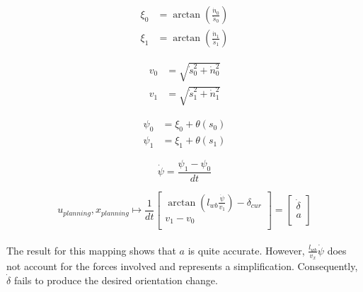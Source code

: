 \[
	\begin{aligned}
		\xi_0 & = \arctan\left(\frac{\dot{n}_0}{\dot{s}_0}\right) \\
		\xi_1 & = \arctan\left(\frac{\dot{n}_1}{\dot{s}_1}\right)
	\end{aligned}
\]

\[
	\begin{aligned}
		v_0 & = \sqrt{\dot{s}_0^2 + \dot{n}_0^2} \\
		v_1 & = \sqrt{\dot{s}_1^2 + \dot{n}_1^2}
	\end{aligned}
\]

\[
	\begin{aligned}
		\psi_0 & = \xi_0 + \theta(s_0) \\
		\psi_1 & = \xi_1 + \theta(s_1)
	\end{aligned}
\]

\[
	\dot{\psi} = \frac{\psi_1 - \psi_0}{dt}
\]

\[
	u_{planning}, x_{planning} \mapsto \frac{1}{dt} \begin{bmatrix}
		\arctan(l_{wb}\frac{\dot{\psi}}{v_1})-\delta_{cur} \\
		v_1 - v_0                                          \\
	\end{bmatrix} = \begin{bmatrix}
		\dot{\delta} \\
		a            \\
	\end{bmatrix}
\]
\\
The result for this mapping shows that $a$ is quite accurate.
However, $\frac{l_{wb}}{v_x}\dot{\psi}$ does not account for the forces involved and represents a simplification.
Consequently, $\dot{\delta}$ fails to produce the desired orientation change.
